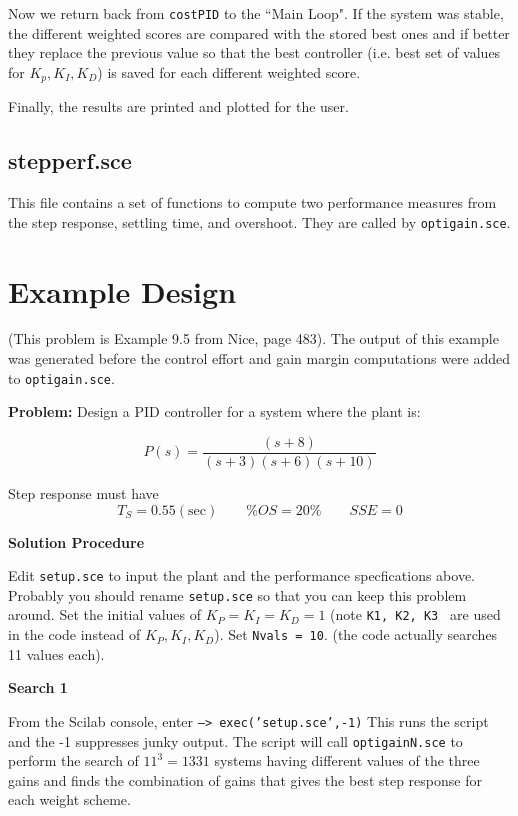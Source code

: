 Now we return back from {\tt costPID} to the ``Main Loop".   If the system was stable, the different weighted scores are compared with the stored best ones and if better they replace the previous value so that the best controller (i.e. best set of values for $K_p, K_I, K_D$) is saved for each different weighted score.

Finally, the results are printed and plotted for the user.


\subsection{stepperf.sce}
This file contains a set of  functions to compute  two performance measures from the step response, settling time, and overshoot.  They are called by {\tt optigain.sce}.









\section{Example Design}


(This problem is Example 9.5 from Nice, page 483).  The output of this example was generated before the control effort and gain margin computations were added to {\tt optigain.sce}.


{\bf Problem: }
Design a PID controller for a system where the plant is:

\[
P(s) = \frac{(s+8)}{(s+3)(s+6)(s+10)}
\]

Step response must have
\[
T_S = 0.55 \mathrm{(sec)} \qquad  \%OS = 20\% \qquad    SSE = 0
\]


{\bf Solution Procedure}

Edit {\tt setup.sce} to input the plant and the performance specfications above.  Probably you should rename {\tt setup.sce} so that you can keep this problem around.    Set the initial values of $K_P= K_I=K_D=1$
(note {\tt K1, K2, K3 } are used in the code instead of $K_P, K_I, K_D$). Set {\tt Nvals = 10}. (the code actually searches 11 values each).

{\bf Search 1}

From the Scilab console, enter  {\tt --> exec('setup.sce',-1)}  This runs the script and the -1 suppresses junky output.
The script will call {\tt optigainN.sce} to perform the search of $11^3 = 1331$ systems having different values of the three gains and finds the combination of gains that gives the best step response for each weight scheme.

